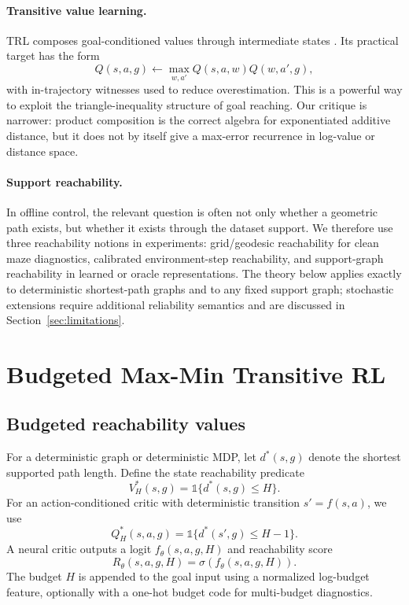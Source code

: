 \documentclass[11pt]{article}
\newcommand{\ind}{\mathbb{1}}
\begin{document}
\paragraph{Transitive value learning.}
TRL composes goal-conditioned values through intermediate states
\citep{park2025trl}. Its practical target has the form
\begin{equation}
    Q(s,a,g) \leftarrow \max_{w,a'} Q(s,a,w)Q(w,a',g),
\end{equation}
with in-trajectory witnesses used to reduce overestimation. This is a powerful
way to exploit the triangle-inequality structure of goal reaching. Our critique
is narrower: product composition is the correct algebra for exponentiated
additive distance, but it does not by itself give a max-error recurrence in
log-value or distance space.

\paragraph{Support reachability.}
In offline control, the relevant question is often not only whether a geometric
path exists, but whether it exists through the dataset support. We therefore use
three reachability notions in experiments: grid/geodesic reachability for clean
maze diagnostics, calibrated environment-step reachability, and support-graph
reachability in learned or oracle representations. The theory below applies
exactly to deterministic shortest-path graphs and to any fixed support graph;
stochastic extensions require additional reliability semantics and are discussed
in Section~\ref{sec:limitations}.

\section{Budgeted Max-Min Transitive RL}

\subsection{Budgeted reachability values}

For a deterministic graph or deterministic MDP, let $d^*(s,g)$ denote the
shortest supported path length. Define the state reachability predicate
\begin{equation}
    V_H^*(s,g)=\ind\{d^*(s,g)\le H\}.
\end{equation}
For an action-conditioned critic with deterministic transition $s'=f(s,a)$, we
use
\begin{equation}
    Q_H^*(s,a,g)=\ind\{d^*(s',g)\le H-1\}.
\end{equation}
A neural critic outputs a logit $f_\theta(s,a,g,H)$ and reachability score
\begin{equation}
    R_\theta(s,a,g,H)=\sigma(f_\theta(s,a,g,H)).
\end{equation}
The budget $H$ is appended to the goal input using a normalized log-budget
feature, optionally with a one-hot budget code for multi-budget diagnostics.
\end{document}
